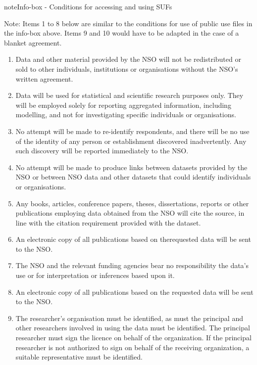 \documentclass[letterpaper,10pt,english]{sphinxmanual}
\begin{document}
\begin{sphinxadmonition}{note}{Info-box - Conditions for accessing and using SUFs}

Note: Items 1 to 8 below are similar to the conditions for use of public use files in the info-box above. Items 9 and 10 would have to be adapted in the case of a blanket agreement.
\begin{enumerate}
\item {} 
Data and other material provided by the NSO will not be redistributed or sold to other individuals, institutions or organisations without the NSO’s written agreement.

\item {} 
Data will be used for statistical and scientific research purposes only. They will be employed solely for reporting aggregated information, including modelling, and not for investigating specific individuals or organisations.

\item {} 
No attempt will be made to re-identify respondents, and there will be no use of the identity of any person or establishment discovered inadvertently. Any such discovery will be reported immediately to the NSO.

\item {} 
No attempt will be made to produce links between datasets provided by the NSO or between NSO data and other datasets that could identify individuals or organisations.

\item {} 
Any books, articles, conference papers, theses, dissertations, reports or other publications employing data obtained from the NSO will cite the source, in line with the citation requirement provided with the dataset.

\item {} 
An electronic copy of all publications based on therequested data will be sent to the NSO.

\item {} 
The NSO and the relevant funding agencies bear no responsibility the data’s use or for interpretation or inferences based upon it.

\item {} 
An electronic copy of all publications based on the requested data will be sent to the NSO.

\item {} 
The researcher’s organisation must be identified, as must the principal and other researchers involved in using the data must be identified. The principal researcher must sign the licence on behalf of the organization. If the principal researcher is not authorized to sign on behalf of the receiving organization, a suitable representative must be identified.


\end{enumerate}
\end{sphinxadmonition}
\end{document}
